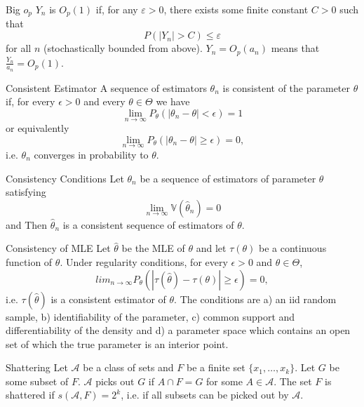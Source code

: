 \documentclass[avery5371,grid]{flashcards}
\begin{document}
\begin{flashcard}[Definition]{Big $o_p$}
$Y_n$ is $O_p(1)$ if, for any $\varepsilon > 0$, there exists some finite constant $C>0$ such that 
\[
P\left( |Y_n|  >  C \right) \le \varepsilon
\]
for all $n$ (stochastically bounded from above). $Y_n = O_p(a_n)$ means that $\frac{Y_n}{a_n} = O_p(1)$.
\end{flashcard}

\begin{flashcard}[Definition]{Consistent Estimator}
A sequence of estimators $\theta_n$ is consistent of the parameter $\theta$ if, for every $\epsilon > 0$ and every $\theta \in \Theta$ we have
\[
\lim_{n \to \infty} P_\theta\left(\left|\theta_n - \theta\right|<\epsilon\right) = 1
\] 
or equivalently 
\[
\lim_{n \to \infty} P_\theta\left(\left|\theta_n - \theta\right| \ge \epsilon\right) = 0,
\]
i.e. $\theta_n$ converges in probability to $\theta$.

\end{flashcard}

\begin{flashcard}[Theorem]{Consistency Conditions}
Let $\theta_n$ be a sequence of estimators of parameter $\theta$ satisfying
\[ \lim_{n \to \infty} \mathbb V\left(\hat \theta_n\right) = 0	\]
and 
Then $\hat \theta_n$ is a consistent sequence of estimators of $\theta$.
\end{flashcard}

\begin{flashcard}[Theorem]{Consistency of MLE}
\scriptsize
Let $\hat \theta$ be the MLE of $\theta$ and let $\tau(\theta)$ be a continuous function of $\theta$. Under regularity conditions, for every $\epsilon > 0$ and $\theta \in \Theta$,
\[
lim_{n \to \infty} P_\theta \left(\left|\tau(\hat \theta) - \tau(\theta)\right| \ge \epsilon\right) = 0,
\]
i.e. $\tau(\hat \theta)$ is a consistent estimator of $\theta$. The conditions are a) an iid random sample, b) identifiability of the parameter, c) common support and differentiability
of the density and d) a parameter space which contains an open set of which the true parameter is an interior point.
\end{flashcard}

\begin{flashcard}[Definition]{Shattering}
Let $\mathcal{A}$ be a class of sets and $F$ be a finite set $\{x_1,\ldots,x_k\}$. Let $G$ be some subset of $F$. $\mathcal A$ picks out $G$ if $A \cap F = G$ for some 
$A \in \mathcal{A}$.
The set $F$ is shattered if $s(\mathcal{A},F) = 2^k$, i.e. if all subsets can be picked out by $\mathcal{A}$. 
\end{flashcard}
\end{document}
